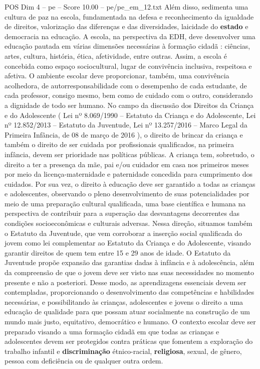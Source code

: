 \begin{textsample}{POS Dim 4 – pe – Score 10.00 – pe/pe\_em\_12.txt}
Além disso, sedimenta uma cultura de paz na escola, fundamentada na defesa e reconhecimento da igualdade de direitos, valorização das diferenças e das diversidades, laicidade do \textbf{estado} e democracia na educação.
A escola, na perspectiva da EDH, deve desenvolver uma educação pautada em várias dimensões necessárias à formação cidadã : ciências, artes, cultura, história, ética, afetividade, entre outras.
Assim, a escola é concebida como espaço sociocultural, lugar de convivência inclusiva, respeitosa e afetiva.
O ambiente escolar deve proporcionar, também, uma convivência acolhedora, de autorresponsabilidade com o desempenho de cada estudante, de cada professor, consigo mesmo, bem como de cuidado com o outro, considerando a dignidade de todo ser humano.
No campo da discussão dos Direitos da Criança e do Adolescente ( Lei nº 8.069/1990 – Estatuto da Criança e do Adolescente, Lei nº 12.852/2013 – Estatuto da Juventude, Lei nº 13.257/2016 – Marco Legal da Primeira Infância, de 08 de março de 2016 ), o direito de brincar da criança e também o direito de ser cuidada por profissionais qualificados, na primeira infância, devem ser prioridade nas políticas públicas.
A criança tem, sobretudo, o direito a ter a presença da mãe, pai e/ou cuidador em casa nos primeiros meses por meio da licença-maternidade e paternidade concedida para cumprimento dos cuidados.
Por sua vez, o direito à educação deve ser garantido a todas as crianças e adolescentes, observando o pleno desenvolvimento de suas potencialidades por meio de uma preparação cultural qualificada, uma base científica e humana na perspectiva de contribuir para a superação das desvantagens decorrentes das condições socioeconômicas e culturais adversas.
Nessa direção, situamos também o Estatuto da Juventude, que vem corroborar a inserção social qualificada do jovem como lei complementar ao Estatuto da Criança e do Adolescente, visando garantir direitos de quem tem entre 15 e 29 anos de idade.
O Estatuto da Juventude propõe expansão das garantias dadas à infância e à adolescência, além da compreensão de que o jovem deve ser visto nas suas necessidades no momento presente e não a posteriori.
Desse modo, as aprendizagens essenciais devem ser contempladas, proporcionando o desenvolvimento das competências e habilidades necessárias, e possibilitando às crianças, adolescentes e jovens o direito a uma educação de qualidade para que possam atuar socialmente na construção de um mundo mais justo, equitativo, democrático e humano.
O contexto escolar deve ser preparado visando a uma formação cidadã em que todas as crianças e adolescentes devem ser protegidos contra práticas que fomentem a exploração do trabalho infantil e \textbf{discriminação} étnico-racial, \textbf{religiosa}, sexual, de gênero, pessoa com deficiência ou de qualquer outra ordem.

\end{textsample}
